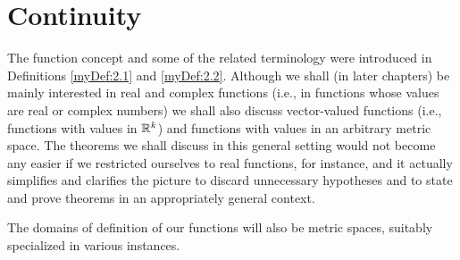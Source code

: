 
\chapter{Continuity}

The function concept and some of the related terminology were introduced in
Definitions \ref{myDef:2.1} and \ref{myDef:2.2}. Although we shall (in later chapters) be mainly interested in real and complex functions (i.e., in functions whose values are real or complex numbers) we shall also discuss vector-valued functions (i.e., functions with values in ${\protect\mathbb R}^{k}$) and functions with values in an arbitrary metric space. The theorems we shall discuss in this general setting would not become any easier if we restricted ourselves to real functions, for instance, and it actually simplifies and clarifies the picture to discard unnecessary hypotheses and to state and prove theorems in an appropriately general context. 

The domains of definition of our functions will also be metric spaces, suitably specialized in various instances.







